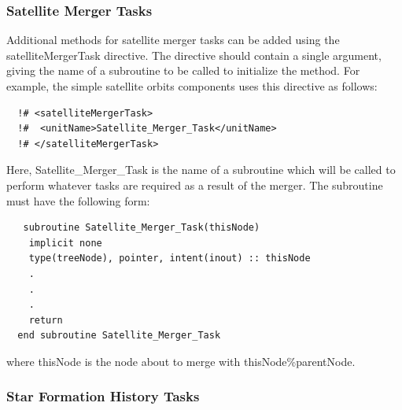 \subsubsection{Satellite Merger Tasks}

Additional methods for satellite merger tasks can be added using the {\normalfont \ttfamily satelliteMergerTask} directive. The directive should contain a single argument, giving the name of a subroutine to be called to initialize the method. For example, the {\normalfont \ttfamily simple} satellite orbits components uses this directive as follows:
\begin{verbatim}
  !# <satelliteMergerTask>
  !#  <unitName>Satellite_Merger_Task</unitName>
  !# </satelliteMergerTask>
\end{verbatim}
Here, {\normalfont \ttfamily Satellite\_Merger\_Task} is the name of a subroutine which will be called to perform whatever tasks are required as a result of the merger. The subroutine must have the following form:
\begin{verbatim}
   subroutine Satellite_Merger_Task(thisNode)
    implicit none
    type(treeNode), pointer, intent(inout) :: thisNode
    .
    .
    .
    return
  end subroutine Satellite_Merger_Task
\end{verbatim}
where {\normalfont \ttfamily thisNode} is the node about to merge with {\normalfont \ttfamily thisNode\%parentNode}.

\subsubsection{Star Formation History Tasks}\label{sec:StarFormationHistoryTasks}

